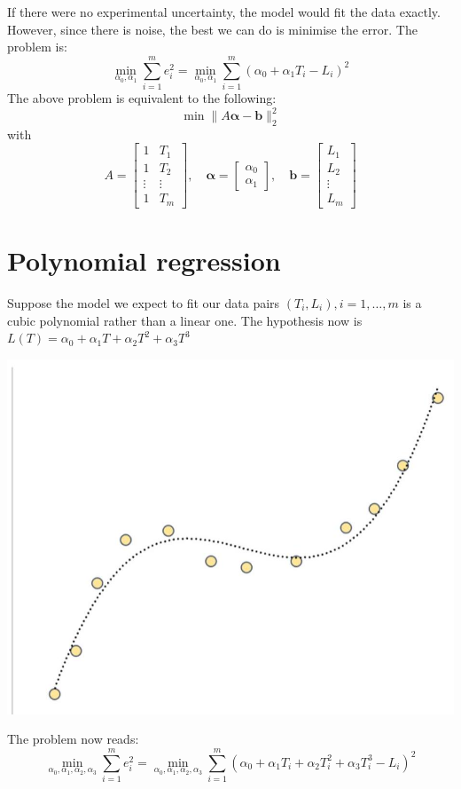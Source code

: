 \documentclass[11pt]{book}
\begin{document}
If there were no experimental uncertainty, the model would fit the data exactly. However, since there is noise, the best we can do is minimise the error. The problem is:
$$
\min _{\alpha_{0}, \alpha_{1}} \sum_{i=1}^{m} e_{i}^{2}=\min _{\alpha_{0}, \alpha_{1}} \sum_{i=1}^{m}\left(\alpha_{0}+\alpha_{1} T_{i}-L_{i}\right)^{2}
$$
The above problem is equivalent to the following:
$$
\min \|A \mathbf{\alpha}-\mathbf{b}\|_{2}^{2}
$$
with
$$
A=\left[\begin{array}{cc}
1 & T_{1} \\
1 & T_{2} \\
\vdots & \vdots \\
1 & T_{m}
\end{array}\right], \quad \mathbf{\alpha}=\left[\begin{array}{c}
\alpha_{0} \\
\alpha_{1}
\end{array}\right], \quad \mathbf{b}=\left[\begin{array}{c}
L_{1} \\
L_{2} \\
\vdots \\
L_{m}
\end{array}\right]
$$

\section*{Polynomial regression}
Suppose the model we expect to fit our data pairs $\left(T_{i}, L_{i}\right), i=1, \ldots, m$ is a cubic polynomial rather than a linear one. The hypothesis now is
$L(T)=\alpha_{0}+\alpha_{1} T+\alpha_{2} T^{2}+\alpha_{3} T^{3}$
\begin{center}
\includegraphics[scale = 0.2]{2023_09_05_b72ccc85584d9dc6fb5cg-304}
\end{center}
The problem now reads:
$$
\min _{\alpha_{0}, \alpha_{1}, \alpha_{2}, \alpha_{3}} \sum_{i=1}^{m} e_{i}^{2}=\min _{\alpha_{0}, \alpha_{1}, \alpha_{2}, \alpha_{3}} \sum_{i=1}^{m}\left(\alpha_{0}+\alpha_{1} T_{i}+\alpha_{2} T_{i}^{2}+\alpha_{3} T_{i}^{3}-L_{i}\right)^{2}
$$
\end{document}
